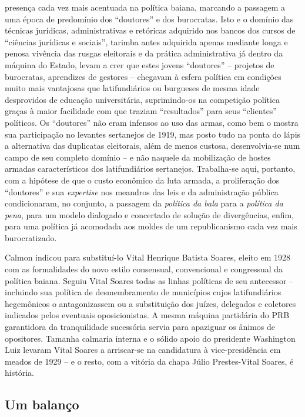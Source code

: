 presença cada vez mais acentuada na política baiana, marcando a passagem a uma época de predomínio dos ``doutores'' e dos burocratas. Isto e o domínio das técnicas jurídicas, administrativas e retóricas adquirido nos bancos dos cursos de ``ciências jurídicas e sociais'', tarimba antes adquirida apenas mediante longa e penosa vivência das rusgas eleitorais e da prática administrativa já dentro da máquina do Estado, levam a crer que estes jovens ``doutores'' -- projetos de burocratas, aprendizes de gestores -- chegavam à esfera política em condições muito mais vantajosas que latifundiários ou burgueses de mesma idade desprovidos de educação universitária, suprimindo-os na competição política graças à maior facilidade com que traziam ``resultados'' para seus ``clientes'' políticos. Os ``doutores'' não eram infensos ao uso das armas, como bem o mostra sua participação no levantes sertanejos de 1919, mas posto tudo na ponta do lápis a alternativa das duplicatas eleitorais, além de menos custosa, desenvolvia-se num campo de seu completo domínio -- e não naquele da mobilização de hostes armadas característicos dos latifundiários sertanejos. Trabalha-se aqui, portanto, com a hipótese de que o custo econômico da luta armada, a proliferação dos ``doutores'' e sua \textit{expertise} nos meandros das leis e da administração pública condicionaram, no conjunto, a passagem da \textit{política da bala} para a \textit{política da pena}, para um modelo dialogado e concertado de solução de divergências, enfim, para uma política já acomodada aos moldes de um republicanismo cada vez mais burocratizado.

Calmon indicou para substituí-lo Vital Henrique Batista Soares, eleito em 1928 com as formalidades do novo estilo consensual, convencional e congressual da política baiana. Seguiu Vital Soares todas as linhas políticas de seu antecessor -- incluindo sua política de desmembramento de municípios cujos latifundiários hegemônicos o antagonizassem ou a substituição dos juízes, delegados e coletores indicados pelos eventuais oposicionistas. A mesma máquina partidária do PRB garantidora da tranquilidade sucessória servia para apaziguar os ânimos de opositores. Tamanha calmaria interna e o sólido apoio do presidente Washington Luiz levaram Vital Soares a arriscar-se na candidatura à vice-presidência em meados de 1929 -- e o resto, com a vitória da chapa Júlio Prestes-Vital Soares, é história.

\subsection{Um balanço}

